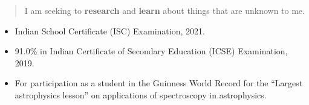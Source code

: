 \documentclass[10pt,a4paper,ragged2e,withhyper]{altacv}
\begin{document}
\begin{paracol}{2}
\begin{quote}
                \medskip
                I am seeking to \textbf{research} and \textbf{learn} about things that are unknown to me. 
            \end{quote}
        
            
        
                \begin{itemize}
                    \item Indian School Certificate (ISC) Examination, 2021.
                \end{itemize}
            \divider
            
                \begin{itemize}
                    \item 91.0\% in Indian Certificate of Secondary Education (ICSE) Examination, 2019.
                \end{itemize}
        
                \begin{itemize}
                    \item For participation as a student in the Guinness World Record for the ``Largest \\astrophysics lesson'' on applications of spectroscopy in astrophysics.
                \end{itemize}
            \divider


\end{paracol}
\end{document}

